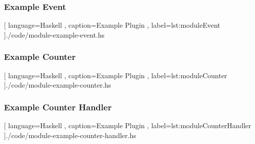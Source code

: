 \begin{frame}
  \frametitle{Example Event}
  \begin{center}
    
    [ language=Haskell
    , caption={Example Plugin}
    , label=lst:moduleEvent
    ]{./code/module-example-event.hs}
  \end{center}
\end{frame}


\begin{frame}
  \frametitle{Example Counter}
  \begin{center}
    
    [ language=Haskell
    , caption={Example Plugin}
    , label=lst:moduleCounter
    ]{./code/module-example-counter.hs}
  \end{center}
\end{frame}


\begin{frame}
  \frametitle{Example Counter Handler}
  \begin{center}
    
    [ language=Haskell
    , caption={Example Plugin}
    , label=lst:moduleCounterHandler
    ]{./code/module-example-counter-handler.hs}
  \end{center}
\end{frame}

